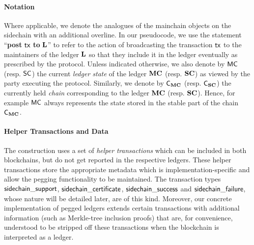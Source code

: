 \paragraph{Notation}
Where applicable, we denote the analogues of the mainchain objects on the
sidechain with an additional overline.
%
In our pseudocode, we use the statement
``\textbf{post} $\mathsf{tx}$ \textbf{to} $\mathbf{L}$''
to refer to the
action of broadcasting the transaction $\mathsf{tx}$ to the maintainers of the ledger
$\mathbf{L}$ so that they include it in the ledger eventually as prescribed by the
protocol.
Unless indicated otherwise, we also denote by $\mathsf{MC}$ (resp.
$\mathsf{SC}$) the current \emph{ledger state} of the ledger $\mathbf{MC}$ (resp. $\mathbf{SC}$) as
viewed by the party executing the protocol. Similarly, we denote by $\mathsf{C_{\mathbf{MC}}}$
(resp. $\mathsf{C_{\mathbf{SC}}}$) the currently held \emph{chain} corresponding to the ledger
$\mathbf{MC}$ (resp. $\mathbf{SC}$). Hence, for example $\mathsf{MC}$ always represents the state
stored in the stable part of the chain $\mathsf{C_{\mathbf{MC}}}$.

\paragraph{Helper Transactions and Data}
The construction uses a set of \textit{helper transactions}
which can be included in both blockchains, but do not get reported
in the respective ledgers. These helper transactions store the appropriate
metadata which is implementation-specific and allow the pegging functionality to be
maintained. The transaction types $\mathsf{side}\-\mathsf{chain\_support}$,
$\mathsf{side}\-\mathsf{chain\_certificate}$,
$\mathsf{side}\-\mathsf{chain\_success}$ and
$\mathsf{side}\-\mathsf{chain\_fai}\-\mathsf{lure}$, whose nature will be
detailed later, are of this kind.
Moreover, our concrete implementation of pegged ledgers extends certain
transactions with additional information (such as Merkle-tree inclusion proofs)
that are, for convenience, understood to be stripped off these transactions when
the blockchain is interpreted as a ledger.


